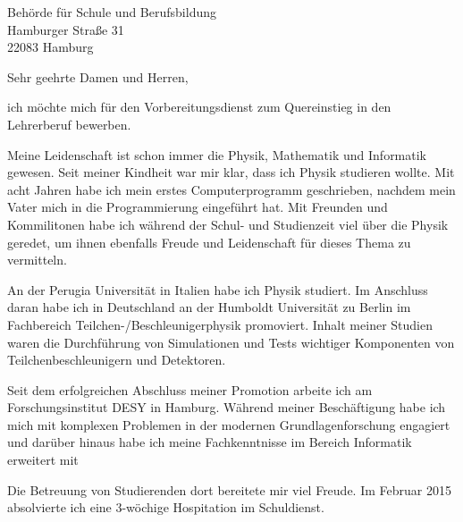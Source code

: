 \documentclass[ebner,paper=a4,fontsize=11pt,ngerman,BCOR=10mm]{scrlttr2}%
\begin{document}
\pagestyle{empty}

\begin{letter}{ Beh{\"o}rde f{\"u}r Schule und Berufsbildung\\
Hamburger Stra{\ss}e 31\\ 
22083 Hamburg}


\opening{Sehr geehrte Damen und Herren,} 

ich m{\"o}chte mich f{\"u}r den Vorbereitungsdienst zum Quereinstieg in den Lehrerberuf bewerben.

Meine Leidenschaft ist schon immer die Physik,  Mathematik und  Informatik gewesen.
Seit meiner Kindheit war mir klar, dass ich Physik studieren wollte. Mit acht Jahren habe ich mein erstes Computerprogramm
geschrieben, nachdem mein Vater mich in die Programmierung eingef{\"u}hrt hat.
Mit Freunden und Kommilitonen habe ich w{\"a}hrend der Schul- und Studienzeit viel {\"u}ber die Physik geredet, um ihnen ebenfalls Freude und Leidenschaft f{\"u}r dieses Thema zu vermitteln.


An der Perugia Universit{\"a}t in Italien habe ich Physik studiert. Im Anschluss daran habe ich in Deutschland an der Humboldt Universit{\"a}t zu Berlin im Fachbereich
Teilchen-/Beschleunigerphysik promoviert. Inhalt meiner Studien waren die Durchf{\"u}hrung von Simulationen und Tests wichtiger Komponenten von Teilchenbeschleunigern und Detektoren.

Seit dem erfolgreichen Abschluss meiner Promotion arbeite ich am Forschungsinstitut DESY in Hamburg. W{\"a}hrend meiner Besch{\"a}ftigung habe ich mich mit komplexen Problemen in der modernen Grundlagenforschung engagiert und  
 dar{\"u}ber hinaus habe ich meine Fachkenntnisse im Bereich Informatik erweitert mit 


Die Betreuung von Studierenden dort bereitete mir viel Freude. Im Februar 2015 absolvierte ich eine 3-w{\"o}chige Hospitation im Schuldienst.


%


\end{letter}
\end{document}
